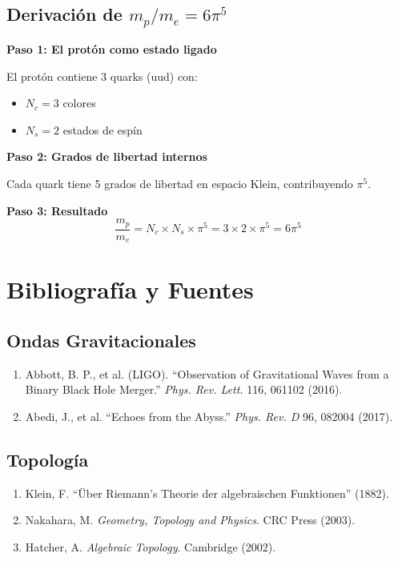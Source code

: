 \documentclass[12pt,a4paper,openany]{book}
\begin{document}
\section{Derivación de $m_p/m_e = 6\pi^5$}

\textbf{Paso 1: El protón como estado ligado}

El protón contiene 3 quarks (uud) con:
\begin{itemize}
    \item $N_c = 3$ colores
    \item $N_s = 2$ estados de espín
\end{itemize}

\textbf{Paso 2: Grados de libertad internos}

Cada quark tiene 5 grados de libertad en espacio Klein, contribuyendo $\pi^5$.

\textbf{Paso 3: Resultado}
\begin{equation}
    \frac{m_p}{m_e} = N_c \times N_s \times \pi^5 = 3 \times 2 \times \pi^5 = 6\pi^5
\end{equation}

\chapter{Bibliografía y Fuentes}

\section*{Ondas Gravitacionales}

\begin{enumerate}
    \item Abbott, B. P., et al. (LIGO). ``Observation of Gravitational Waves from a Binary Black Hole Merger.'' \textit{Phys. Rev. Lett.} 116, 061102 (2016).
    \item Abedi, J., et al. ``Echoes from the Abyss.'' \textit{Phys. Rev. D} 96, 082004 (2017).
\end{enumerate}

\section*{Topología}

\begin{enumerate}
    \item Klein, F. ``Über Riemann's Theorie der algebraischen Funktionen'' (1882).
    \item Nakahara, M. \textit{Geometry, Topology and Physics}. CRC Press (2003).
    \item Hatcher, A. \textit{Algebraic Topology}. Cambridge (2002).
\end{enumerate}
\end{document}
